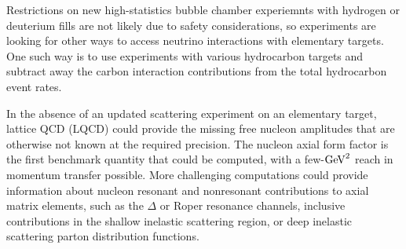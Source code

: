 Restrictions on new high-statistics bubble chamber experiemnts with
 hydrogen or deuterium fills are not likely due to safety considerations,
 so experiments are looking for other ways to access neutrino interactions
 with elementary targets.
One such way is to use experiments with various hydrocarbon targets
 and subtract away the carbon interaction contributions from
 the total hydrocarbon event rates.

In the absence of an updated scattering experiment on an elementary target,
 lattice QCD (LQCD) could provide the missing free nucleon amplitudes
 that are otherwise not known at the required precision.
The nucleon axial form factor is the first benchmark quantity that could be computed,
 with a few-${\rm GeV}^2$ reach in momentum transfer possible.
More challenging computations could provide information about nucleon
 resonant and nonresonant contributions to axial matrix elements,
 such as the $\Delta$ or Roper resonance channels,
 inclusive contributions in the shallow inelastic scattering region,
 or deep inelastic scattering parton distribution functions.

